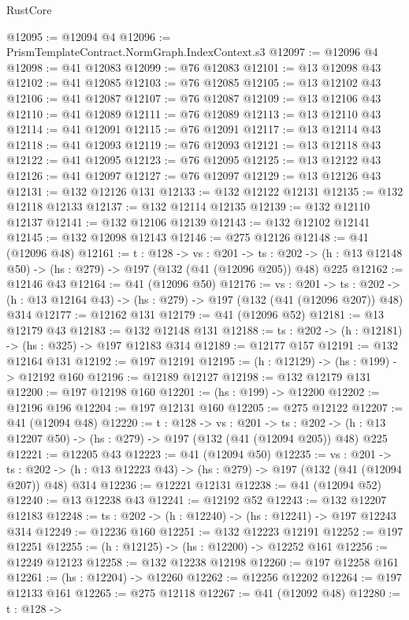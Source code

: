 \begin{lexlean}{RustCore}
\begin{coremodule}
@12095 := @12094 @4
@12096 := PrismTemplateContract.NormGraph.IndexContext.s3
@12097 := @12096 @4
@12098 := @41 @12083
@12099 := @76 @12083
@12101 := @13 @12098 @43
@12102 := @41 @12085
@12103 := @76 @12085
@12105 := @13 @12102 @43
@12106 := @41 @12087
@12107 := @76 @12087
@12109 := @13 @12106 @43
@12110 := @41 @12089
@12111 := @76 @12089
@12113 := @13 @12110 @43
@12114 := @41 @12091
@12115 := @76 @12091
@12117 := @13 @12114 @43
@12118 := @41 @12093
@12119 := @76 @12093
@12121 := @13 @12118 @43
@12122 := @41 @12095
@12123 := @76 @12095
@12125 := @13 @12122 @43
@12126 := @41 @12097
@12127 := @76 @12097
@12129 := @13 @12126 @43
@12131 := @132 @12126 @131
@12133 := @132 @12122 @12131
@12135 := @132 @12118 @12133
@12137 := @132 @12114 @12135
@12139 := @132 @12110 @12137
@12141 := @132 @12106 @12139
@12143 := @132 @12102 @12141
@12145 := @132 @12098 @12143
@12146 := @275 @12126
@12148 := @41 (@12096 @48)
@12161 := {t : @128} ->
  {vs : @201} ->
  {ts : @202} -> (h : @13 @12148 @50) -> (hs : @279) -> @197 (@132 (@41 (@12096 @205)) @48) @225
@12162 := @12146 @43
@12164 := @41 (@12096 @50)
@12176 := {vs : @201} ->
  {ts : @202} -> (h : @13 @12164 @43) -> (hs : @279) -> @197 (@132 (@41 (@12096 @207)) @48) @314
@12177 := @12162 @131
@12179 := @41 (@12096 @52)
@12181 := @13 @12179 @43
@12183 := @132 @12148 @131
@12188 := {ts : @202} -> (h : @12181) -> (hs : @325) -> @197 @12183 @314
@12189 := @12177 @157
@12191 := @132 @12164 @131
@12192 := @197 @12191
@12195 := (h : @12129) -> (hs : @199) -> @12192 @160
@12196 := @12189 @12127
@12198 := @132 @12179 @131
@12200 := @197 @12198 @160
@12201 := (hs : @199) -> @12200
@12202 := @12196 @196
@12204 := @197 @12131 @160
@12205 := @275 @12122
@12207 := @41 (@12094 @48)
@12220 := {t : @128} ->
  {vs : @201} ->
  {ts : @202} -> (h : @13 @12207 @50) -> (hs : @279) -> @197 (@132 (@41 (@12094 @205)) @48) @225
@12221 := @12205 @43
@12223 := @41 (@12094 @50)
@12235 := {vs : @201} ->
  {ts : @202} -> (h : @13 @12223 @43) -> (hs : @279) -> @197 (@132 (@41 (@12094 @207)) @48) @314
@12236 := @12221 @12131
@12238 := @41 (@12094 @52)
@12240 := @13 @12238 @43
@12241 := @12192 @52
@12243 := @132 @12207 @12183
@12248 := {ts : @202} -> (h : @12240) -> (hs : @12241) -> @197 @12243 @314
@12249 := @12236 @160
@12251 := @132 @12223 @12191
@12252 := @197 @12251
@12255 := (h : @12125) -> (hs : @12200) -> @12252 @161
@12256 := @12249 @12123
@12258 := @132 @12238 @12198
@12260 := @197 @12258 @161
@12261 := (hs : @12204) -> @12260
@12262 := @12256 @12202
@12264 := @197 @12133 @161
@12265 := @275 @12118
@12267 := @41 (@12092 @48)
@12280 := {t : @128} ->

\end{coremodule}
\end{lexlean}
